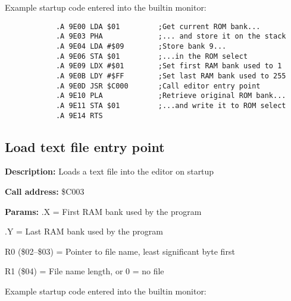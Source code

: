 \documentclass{article}
\begin{document}
        \vspace{1em}Example startup code entered into the builtin monitor:

        \begin{verbatim}
            .A 9E00 LDA $01         ;Get current ROM bank...
            .A 9E03 PHA             ;... and store it on the stack
            .A 9E04 LDA #$09        ;Store bank 9...
            .A 9E06 STA $01         ;...in the ROM select
            .A 9E09 LDX #$01        ;Set first RAM bank used to 1
            .A 9E0B LDY #$FF        ;Set last RAM bank used to 255
            .A 9E0D JSR $C000       ;Call editor entry point
            .A 9E10 PLA             ;Retrieve original ROM bank...
            .A 9E11 STA $01         ;...and write it to ROM select
            .A 9E14 RTS
        \end{verbatim}

    \subsection{Load text file entry point}

        \begin{hangparas}{3cm}{1}

            \textbf{Description:} \tabto{3cm} Loads a text file into the editor on startup

            \textbf{Call address:} \tabto{3cm}\$C003

            \textbf{Params:} \tabto{3cm}.X = First RAM bank used by the program
        
            \tabto{3cm} .Y = Last RAM bank used by the program

            \tabto{3cm} R0 (\$02--\$03) = Pointer to file name, least significant byte first

            \tabto{3cm} R1 (\$04) = File name length, or 0 = no file

        \end{hangparas}

        \vspace{1em}Example startup code entered into the builtin monitor:
\end{document}
